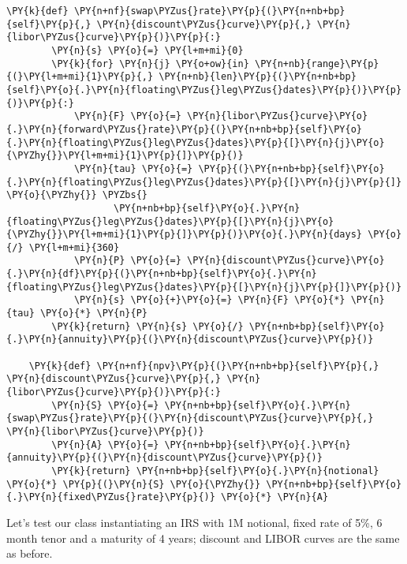 \begin{tcolorbox}[breakable, size=fbox, boxrule=1pt, pad at break*=1mm,colback=cellbackground, colframe=cellborder]
\begin{Verbatim}[commandchars=\\\{\}]
    \PY{k}{def} \PY{n+nf}{swap\PYZus{}rate}\PY{p}{(}\PY{n+nb+bp}{self}\PY{p}{,} \PY{n}{discount\PYZus{}curve}\PY{p}{,} \PY{n}{libor\PYZus{}curve}\PY{p}{)}\PY{p}{:}
        \PY{n}{s} \PY{o}{=} \PY{l+m+mi}{0}
        \PY{k}{for} \PY{n}{j} \PY{o+ow}{in} \PY{n+nb}{range}\PY{p}{(}\PY{l+m+mi}{1}\PY{p}{,} \PY{n+nb}{len}\PY{p}{(}\PY{n+nb+bp}{self}\PY{o}{.}\PY{n}{floating\PYZus{}leg\PYZus{}dates}\PY{p}{)}\PY{p}{)}\PY{p}{:}
            \PY{n}{F} \PY{o}{=} \PY{n}{libor\PYZus{}curve}\PY{o}{.}\PY{n}{forward\PYZus{}rate}\PY{p}{(}\PY{n+nb+bp}{self}\PY{o}{.}\PY{n}{floating\PYZus{}leg\PYZus{}dates}\PY{p}{[}\PY{n}{j}\PY{o}{\PYZhy{}}\PY{l+m+mi}{1}\PY{p}{]}\PY{p}{)}
            \PY{n}{tau} \PY{o}{=} \PY{p}{(}\PY{n+nb+bp}{self}\PY{o}{.}\PY{n}{floating\PYZus{}leg\PYZus{}dates}\PY{p}{[}\PY{n}{j}\PY{p}{]} \PY{o}{\PYZhy{}} \PYZbs{}
                   \PY{n+nb+bp}{self}\PY{o}{.}\PY{n}{floating\PYZus{}leg\PYZus{}dates}\PY{p}{[}\PY{n}{j}\PY{o}{\PYZhy{}}\PY{l+m+mi}{1}\PY{p}{]}\PY{p}{)}\PY{o}{.}\PY{n}{days} \PY{o}{/} \PY{l+m+mi}{360}
            \PY{n}{P} \PY{o}{=} \PY{n}{discount\PYZus{}curve}\PY{o}{.}\PY{n}{df}\PY{p}{(}\PY{n+nb+bp}{self}\PY{o}{.}\PY{n}{floating\PYZus{}leg\PYZus{}dates}\PY{p}{[}\PY{n}{j}\PY{p}{]}\PY{p}{)}
            \PY{n}{s} \PY{o}{+}\PY{o}{=} \PY{n}{F} \PY{o}{*} \PY{n}{tau} \PY{o}{*} \PY{n}{P}
        \PY{k}{return} \PY{n}{s} \PY{o}{/} \PY{n+nb+bp}{self}\PY{o}{.}\PY{n}{annuity}\PY{p}{(}\PY{n}{discount\PYZus{}curve}\PY{p}{)}
        
    \PY{k}{def} \PY{n+nf}{npv}\PY{p}{(}\PY{n+nb+bp}{self}\PY{p}{,} \PY{n}{discount\PYZus{}curve}\PY{p}{,} \PY{n}{libor\PYZus{}curve}\PY{p}{)}\PY{p}{:}
        \PY{n}{S} \PY{o}{=} \PY{n+nb+bp}{self}\PY{o}{.}\PY{n}{swap\PYZus{}rate}\PY{p}{(}\PY{n}{discount\PYZus{}curve}\PY{p}{,} \PY{n}{libor\PYZus{}curve}\PY{p}{)}
        \PY{n}{A} \PY{o}{=} \PY{n+nb+bp}{self}\PY{o}{.}\PY{n}{annuity}\PY{p}{(}\PY{n}{discount\PYZus{}curve}\PY{p}{)}
        \PY{k}{return} \PY{n+nb+bp}{self}\PY{o}{.}\PY{n}{notional} \PY{o}{*} \PY{p}{(}\PY{n}{S} \PY{o}{\PYZhy{}} \PY{n+nb+bp}{self}\PY{o}{.}\PY{n}{fixed\PYZus{}rate}\PY{p}{)} \PY{o}{*} \PY{n}{A}
\end{Verbatim}
\end{tcolorbox}

Let's test our class instantiating an IRS with 1M notional, fixed rate
of 5\%, 6 month tenor and a maturity of 4 years; discount and LIBOR
curves are the same as before.

